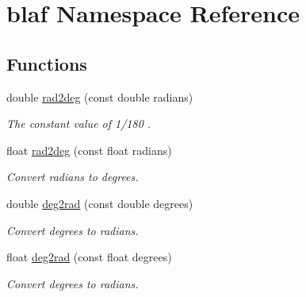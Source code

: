 \hypertarget{namespaceblaf}{\section{blaf \-Namespace \-Reference}
\label{namespaceblaf}
}
\subsection*{\-Functions}
\begin{DoxyCompactItemize}
\item 
double \hyperlink{namespaceblaf_a3d0a8e7bdb64e1451b5d6c267e895e0a}{rad2deg} (const double radians)
\begin{DoxyCompactList}\small\item\em \-The constant value of 1/180 . \end{DoxyCompactList}\item 
float \hyperlink{namespaceblaf_a909ca91bbd8e85b55b12ad57a1d2bc92}{rad2deg} (const float radians)
\begin{DoxyCompactList}\small\item\em \-Convert radians to degrees. \end{DoxyCompactList}\item 
double \hyperlink{namespaceblaf_afc65e65ad15ba81dd610ec730e026a7d}{deg2rad} (const double degrees)
\begin{DoxyCompactList}\small\item\em \-Convert degrees to radians. \end{DoxyCompactList}\item 
float \hyperlink{namespaceblaf_a28c67e8ed18d1a3d75e4cb46168fd145}{deg2rad} (const float degrees)
\begin{DoxyCompactList}\small\item\em \-Convert degrees to radians. \end{DoxyCompactList}\end{DoxyCompactItemize}

